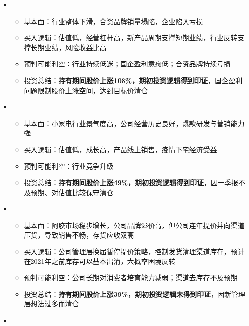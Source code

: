   \begin{itemize}[leftmargin=*]
    \item
      {\small
      \begin{itemize}
        \item 基本面：行业整体下滑，合资品牌销量塌陷，企业陷入亏损
        \item 买入逻辑：估值低，经营杠杆高，新产品周期支撑短期业绩，行业反转支撑长期业绩，风险收益比高
        \item 预判可能利空：行业持续低迷；国企盈利意愿低；合资品牌持续亏损
        \item 投资总结：\textbf{持有期间股价上涨108\%，期初投资逻辑得到印证}，国企盈利问题限制股价上涨空间，达到目标价清仓
      \end{itemize}
      }
    \item
      {\small
      \begin{itemize}
        \item 基本面：小家电行业景气度高，公司经营历史良好，爆款研发与营销能力强
        \item 买入逻辑：估值低，成长高，产品线上销售，疫情下宅经济受益
        \item 预判可能利空：行业竞争升级
        \item 投资总结：\textbf{持有期间股价上涨49\%，期初投资逻辑得到印证}，因一季报不及预期、对估值比较保守清仓
      \end{itemize}
      }
    \item
      {\small
      \begin{itemize}
        \item 基本面：阿胶市场稳步增长，公司品牌溢价高，但公司连年提价并向渠道压货，导致销售不畅，存货应收双高
        \item 买入逻辑：公司管理层换届暂停提价策略，控制发货清理渠道库存，预计在2021年之前库存可以基本出清，大概率困境反转
        \item 预判可能利空：公司长期对消费者培育能力减弱；渠道去库存不及预期
        \item 投资总结：\textbf{持有期间股价上涨39\%，期初投资逻辑未得到印证}，因新管理层想法过多而清仓
      \end{itemize}
      }
    \item
      {\small
      \begin{itemize}

\end{itemize}}
\end{itemize}
